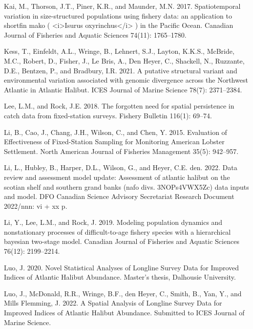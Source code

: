 \documentclass[12pt]{article}\usepackage[]{graphicx}\usepackage[]{color}
\begin{document}
\leavevmode\hypertarget{ref-Kai2017}{}%
Kai, M., Thorson, J.T., Piner, K.R., and Maunder, M.N. 2017. Spatiotemporal variation in size-structured populations using fishery data: an application to shortfin mako ( \textless i\textgreater Isurus oxyrinchus\textless/i\textgreater{} ) in the Pacific Ocean. Canadian Journal of Fisheries and Aquatic Sciences 74(11): 1765--1780.

\leavevmode\hypertarget{ref-Kess2021}{}%
Kess, T., Einfeldt, A.L., Wringe, B., Lehnert, S.J., Layton, K.K.S., McBride, M.C., Robert, D., Fisher, J., Le Bris, A., Den Heyer, C., Shackell, N., Ruzzante, D.E., Bentzen, P., and Bradbury, I.R. 2021. A putative structural variant and environmental variation associated with genomic divergence across the Northwest Atlantic in Atlantic Halibut. ICES Journal of Marine Science 78(7): 2371--2384.

\leavevmode\hypertarget{ref-Lee2018}{}%
Lee, L.M., and Rock, J.E. 2018. The forgotten need for spatial persistence in catch data from fixed-station surveys. Fishery Bulletin 116(1): 69--74.

\leavevmode\hypertarget{ref-Li2015}{}%
Li, B., Cao, J., Chang, J.H., Wilson, C., and Chen, Y. 2015. Evaluation of Effectiveness of Fixed-Station Sampling for Monitoring American Lobster Settlement. North American Journal of Fisheries Management 35(5): 942--957.

\leavevmode\hypertarget{ref-Li2022}{}%
Li, L., Hubley, B., Harper, D.L., Wilson, G., and Heyer, C.E. den. 2022. Data review and assessment model update: Assessment of atlantic halibut on the scotian shelf and southern grand banks (nafo divs. 3NOPs4VWX5Zc) data inputs and model. DFO Canadian Science Advisory Secretariat Research Document 2022/nnn: vi + xx p.

\leavevmode\hypertarget{ref-Li2019}{}%
Li, Y., Lee, L.M., and Rock, J. 2019. Modeling population dynamics and nonstationary processes of difficult-to-age fishery species with a hierarchical bayesian two-stage model. Canadian Journal of Fisheries and Aquatic Sciences 76(12): 2199--2214.

\leavevmode\hypertarget{ref-Luo2020}{}%
Luo, J. 2020. Novel Statistical Analyses of Longline Survey Data for Improved Indices of Atlantic Halibut Abundance. Master's thesis, Dalhousie University.

\leavevmode\hypertarget{ref-Luo2022}{}%
Luo, J., McDonald, R.R., Wringe, B.F., den Heyer, C., Smith, B., Yan, Y., and Mills Flemming, J. 2022. A Spatial Analysis of Longline Survey Data for Improved Indices of Atlantic Halibut Abundance. Submitted to ICES Journal of Marine Science.
\end{document}
